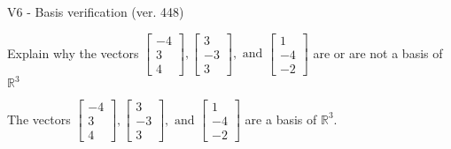 \begin{exercise}
  \begin{exerciseTitle}V6 - Basis verification (ver. 448)\end{exerciseTitle}
  \begin{exerciseStatement}
    Explain why the vectors \(\left[\begin{array}{r}
-4 \\
3 \\
4
\end{array}\right] , \left[\begin{array}{r}
3 \\
-3 \\
3
\end{array}\right] , \text{ and } \left[\begin{array}{r}
1 \\
-4 \\
-2
\end{array}\right]\) are or are not a basis of \(\mathbb{R}^3\)	


  \end{exerciseStatement}
  \begin{exerciseAnswer}
   The vectors \(\left[\begin{array}{r}
-4 \\
3 \\
4
\end{array}\right] , \left[\begin{array}{r}
3 \\
-3 \\
3
\end{array}\right] , \text{ and } \left[\begin{array}{r}
1 \\
-4 \\
-2
\end{array}\right]\) 
  	 are  a basis of \(\mathbb{R}^3\).
  


  \end{exerciseAnswer}
\end{exercise}